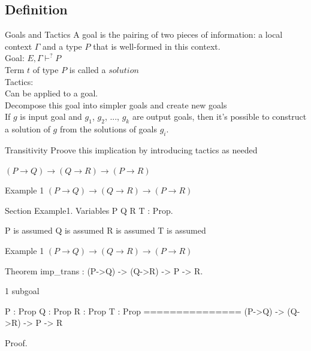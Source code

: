 \subsection{Definition}
\begin{frame}{Goals and Tactics}
	A goal is the pairing of two pieces of information: a local context $\Gamma$ and a type $P$ that is well-formed in this context.\\
	\medskip
	\pause
	Goal: $E, \Gamma \vdash^? P$\\
	\pause
	Term $t$ of type $P$ is called a $solution$\\
	\pause
	\bigskip
	Tactics:\\
	Can be applied to a goal.\\
	Decompose this goal into simpler goals and create new goals\\
	\pause
	\medskip
	If $g$ is input goal and $g_1$, $g_2$, ..., $g_k$ are output goals, then it's possible to construct a solution of $g$ from the solutions of goals $g_i$.
\end{frame}
\begin{frame}{Transitivity}
	Proove this implication by introducing tactics as needed
	\begin{center}
		$(P \rightarrow Q) \rightarrow (Q \rightarrow R) \rightarrow (P \rightarrow R)$
	\end{center}
\end{frame}
\begin{frame}[fragile]{Example 1}
	$(P \rightarrow Q) \rightarrow (Q \rightarrow R) \rightarrow (P \rightarrow R)$
	\pause
	\begin{user}
		Section Example1.
		Variables P Q R T : Prop.
	\end{user}
	\pause
	\begin{coq}
		P is assumed
		Q is assumed
		R is assumed
		T is assumed
	\end{coq}
\end{frame}
\begin{frame}[fragile]{Example 1}
	$(P \rightarrow Q) \rightarrow (Q \rightarrow R) \rightarrow (P \rightarrow R)$
	\pause
	\begin{user}
		Theorem imp_trans : (P->Q) -> (Q->R) -> P -> R.
	\end{user}
	\pause
	\begin{coq}
		1 subgoal

		P : Prop
		Q : Prop
		R : Prop
		T : Prop
		===============
		 (P->Q) -> (Q->R) -> P -> R
	\end{coq}
	\pause
	\begin{user}
		Proof.
	\end{user}
\end{frame}

